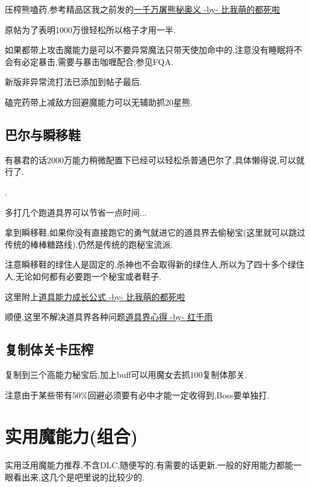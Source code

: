 		压榨熊嗑药,参考精品区我之前发的\href{http://tieba.baidu.com/p/3825275063}{一千万屠熊秘奥义 -by- 比我萌的都死啦}

		原帖为了表明1000万很轻松所以格子才用一半.

		如果都带上攻击魔能力是可以不要异常魔法只带天使加命中的,注意没有睡眠将不会有必定暴击,需要与暴击咖喱配合,参见FQA.

		新版非异常流打法已添加到帖子最后.

		磕完药带上减敌方回避魔能力可以无辅助抓20星熊.

		\subsection{巴尔与瞬移鞋}

		有暴君的话2000万能力稍微配置下已经可以轻松杀普通巴尔了,具体懒得说,可以就行了.

		{\color{red}{即便没有这里也建议用2000万能力挑战下,整个游戏挑战关已经没几个了,如果觉得困难可以参考后面修罗篇的巴尔攻略}}.

		多打几个跑道具界可以节省一点时间...

		拿到瞬移鞋,如果你没有直接跑它的勇气就进它的道具界去偷秘宝(这里就可以跳过传统的棒棒糖路线),仍然是传统的跑秘宝流派.

		注意瞬移鞋的绿住人是固定的,杀神也不会取得新的绿住人,所以为了四十多个绿住人,无论如何都有必要跑一个秘宝或者鞋子.

		这里附上\href{http://tieba.baidu.com/f?kz=3834692385}{道具能力成长公式 -by- 比我萌的都死啦}

		顺便,这里不解决道具界各种问题\href{http://tieba.baidu.com/p/3730196003}{道具界心得 -by- 红千雨}


		\subsection{复制体关卡压榨}

		复制到三个高能力秘宝后,加上buff可以用魔女去抓100复制体那关.

		注意由于某些带有50\%回避必须要有必中才能一定收得到,Boss要单独打.
	
	\newpage

	\section{实用魔能力(组合)}

	实用泛用魔能力推荐,不含DLC,随便写的,有需要的话更新.一般的好用能力都能一眼看出来,这几个是吧里说的比较少的.

